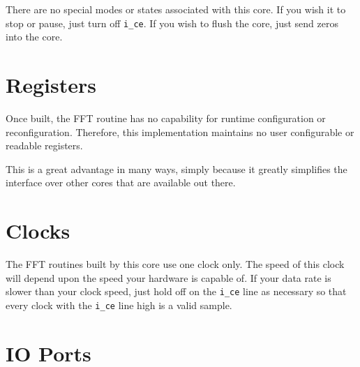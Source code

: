 \documentclass{gqtekspec}
\begin{document}
There are no special modes or states associated with this core.  If you wish
it to stop or pause, just turn off {\tt i\_ce}.  If you wish to flush the
core, just send zeros into the core.

\chapter{Registers}

Once built, the FFT routine has no capability for runtime configuration
or reconfiguration.  Therefore, this implementation maintains no user
configurable or readable registers.

This is a great advantage in many ways, simply because it greatly simplifies
the interface over other cores that are available out there.

\chapter{Clocks}

The FFT routines built by this core use one clock only.  The speed of this
clock will depend upon the speed your hardware is capable of.  If your data
rate is slower than your clock speed, just hold off on the {\tt i\_ce}
line as necessary so that every clock with the {\tt i\_ce} line high is a 
valid sample.

\chapter{IO Ports}
\end{document}
